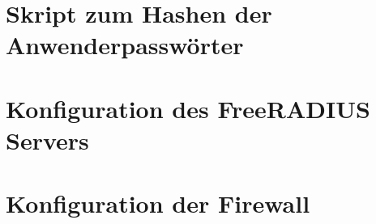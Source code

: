 \documentclass[11pt,a4paper,titlepage=firstiscover]{scrartcl} %
\begin{document}
\section{Skript zum Hashen der Anwenderpassw\"orter}\label{sec:SkriptB}
\newpage
\section{Konfiguration des FreeRADIUS Servers}\label{sec:RADIUS-Konfig}
\newpage
\section{Konfiguration der Firewall}\label{sec:Firewall-Konfig}

%
%
\end{document}
